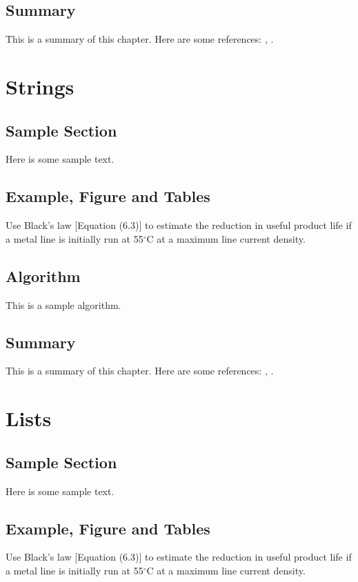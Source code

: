 \documentclass{wileySix}
\begin{document}
\section{Summary}
This is a summary of this chapter.
Here are some references: \cite{xkilby}, \cite{xberen}.

\chapter{Strings}

\section{Sample Section}
Here is some sample text.

\section{Example, Figure and Tables}
\vskip6pt
\begin{example}
	Use Black's law [Equation (6.3)] to estimate the reduction in useful product
	life if a metal line is initially run at 55$^\circ$C at a maximum line
	current density.
\end{example}

\section{Algorithm}
This is a sample algorithm.

\section{Summary}
This is a summary of this chapter.
Here are some references: \cite{xkilby}, \cite{xberen}.

\chapter{Lists}

\section{Sample Section}
Here is some sample text.

\section{Example, Figure and Tables}
\vskip6pt
\begin{example}
	Use Black's law [Equation (6.3)] to estimate the reduction in useful product
	life if a metal line is initially run at 55$^\circ$C at a maximum line
	current density.
\end{example}
\end{document}

